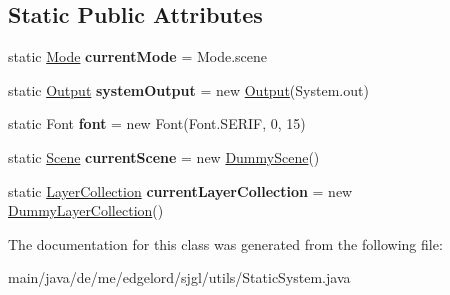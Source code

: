 \subsection*{Static Public Attributes}
\begin{DoxyCompactItemize}
\item 
\mbox{\label{classde_1_1me_1_1edgelord_1_1sjgl_1_1utils_1_1_static_system_a351bd802abc004bf39101480485ef7df}} 
static \mbox{\hyperlink{enumde_1_1me_1_1edgelord_1_1sjgl_1_1utils_1_1_static_system_1_1_mode}{Mode}} {\bfseries current\+Mode} = Mode.\+scene
\item 
\mbox{\label{classde_1_1me_1_1edgelord_1_1sjgl_1_1utils_1_1_static_system_a2b8cea150a6f056f0b8760b7b05b72ee}} 
static \mbox{\hyperlink{classde_1_1me_1_1edgelord_1_1sjgl_1_1output_1_1_output}{Output}} {\bfseries system\+Output} = new \mbox{\hyperlink{classde_1_1me_1_1edgelord_1_1sjgl_1_1output_1_1_output}{Output}}(System.\+out)
\item 
\mbox{\label{classde_1_1me_1_1edgelord_1_1sjgl_1_1utils_1_1_static_system_a16546b1d45a96fcdb848572f469a081a}} 
static Font {\bfseries font} = new Font(Font.\+S\+E\+R\+IF, 0, 15)
\item 
\mbox{\label{classde_1_1me_1_1edgelord_1_1sjgl_1_1utils_1_1_static_system_a09bea25cb16fadb372cbf519c80c7833}} 
static \mbox{\hyperlink{classde_1_1me_1_1edgelord_1_1sjgl_1_1scene_1_1_scene}{Scene}} {\bfseries current\+Scene} = new \mbox{\hyperlink{classtesting_1_1dummys_1_1_dummy_scene}{Dummy\+Scene}}()
\item 
\mbox{\label{classde_1_1me_1_1edgelord_1_1sjgl_1_1utils_1_1_static_system_af3a442a2ad375a7bf789a1ec7655e8a1}} 
static \mbox{\hyperlink{classde_1_1me_1_1edgelord_1_1sjgl_1_1layer_1_1_layer_collection}{Layer\+Collection}} {\bfseries current\+Layer\+Collection} = new \mbox{\hyperlink{classtesting_1_1dummys_1_1_dummy_layer_collection}{Dummy\+Layer\+Collection}}()
\end{DoxyCompactItemize}


The documentation for this class was generated from the following file\+:\begin{DoxyCompactItemize}
\item 
main/java/de/me/edgelord/sjgl/utils/Static\+System.\+java\end{DoxyCompactItemize}
